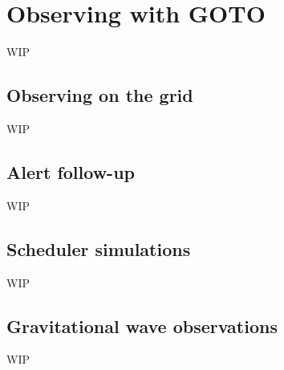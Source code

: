 \section{Observing with GOTO}
\label{sec:observing}
\begin{colsection}


\begin{colsection}

WIP

\end{colsection}


\subsection{Observing on the grid}
\label{sec:grid_observing}
\begin{colsection}

WIP

\end{colsection}


\subsection{Alert follow-up}
\label{sec:alert_followup}
\begin{colsection}

WIP

\end{colsection}


\subsection{Scheduler simulations}
\label{sec:simulations}
\begin{colsection}

WIP

\end{colsection}


\subsection{Gravitational wave observations}
\label{sec:gw_followup}
\begin{colsection}

WIP


\end{colsection}
\end{colsection}
